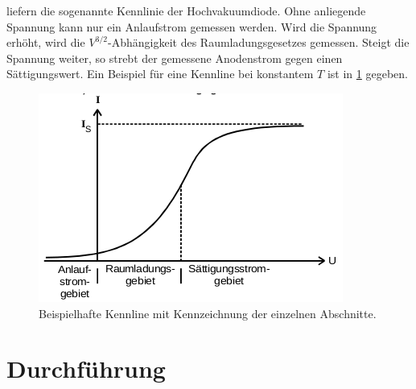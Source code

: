 liefern die sogenannte Kennlinie der Hochvakuumdiode. Ohne anliegende Spannung kann nur
ein Anlaufstrom gemessen werden. Wird die Spannung erhöht, wird die $V^{3/2}$-Abhängigkeit
des Raumladungsgesetzes gemessen. Steigt die Spannung weiter, so strebt der gemessene Anodenstrom gegen
einen Sättigungswert. Ein Beispiel für eine Kennline bei konstantem $T$ ist in \ref{abb:6}
gegeben.
\begin{figure}
  \centering
  \includegraphics[scale=0.4]{kennlinie.png}
  \caption{Beispielhafte Kennline mit Kennzeichnung der einzelnen Abschnitte\cite{anleitung}.}
  \label{abb:6}
\end{figure}
\section{Durchführung}
